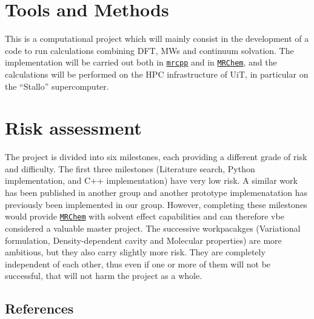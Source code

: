 \documentclass[a4paper,11pt]{article}
\newcommand{\mrchem}{\href{https://mrchem.readthedocs.io/en/latest/}{\texttt{MRChem}}}
\newcommand{\mrcpp}{\href{https://mrcpp.readthedocs.io/en/latest/}{\texttt{mrcpp}}}
\begin{document}
\section{Tools and Methods}

This is a computational project which will mainly consist in the
development of a code to run calculations combining \ac{DFT},
\acp{MW} and continuum solvation. The implementation will be carried
out both in \mrcpp{} and in \mrchem, and the calculations will be
performed on the \ac{HPC} infrastructure of UiT, in particular on the ``Stallo'' supercomputer.

\section{Risk assessment}

The project is divided into six milestones, each providing a different
grade of risk and difficulty. The first three milestones (Literature
search, Python implementation, and C++ implementation) have very low
risk. A similar work has been published in another group and another
prototype implemenatation has previously been implemented in our group.
However, completing these milestones
would provide \mrchem{} with solvent effect capabilities and can
therefore vbe considered a valuable master project.
The successive workpacakges
(Variational formulation, Density-dependent cavity and Molecular
properties) are more ambitious, but they also carry slightly more
risk. They are completely independent of each
other, thus even if one or more of them will not be successful, that
will not harm the project as a whole. 

\subsection*{References}
\printbibliography[heading=none]


\end{document}
